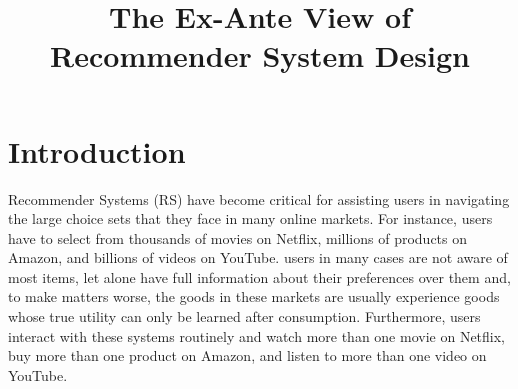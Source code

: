 \documentclass[sigconf]{acmart}
\begin{document}

%
\title{The Ex-Ante View of Recommender System Design}
%

%
\begin{abstract}
\end{abstract}

%
%

%

%

\maketitle

\section{Introduction}

Recommender Systems (RS) have become critical for assisting users in navigating the large choice sets that they face in many online markets. For instance, users have to select from thousands of movies on Netflix, millions of products on Amazon, and billions of videos on YouTube. users in many cases are not aware of most items, let alone have full information about their preferences over them and, to make matters worse, the goods in these markets are usually experience goods whose true utility can only be learned after consumption. Furthermore, users interact with these systems routinely and watch more than one movie on Netflix, buy more than one product on Amazon, and listen to more than one video on YouTube.
\end{document}
